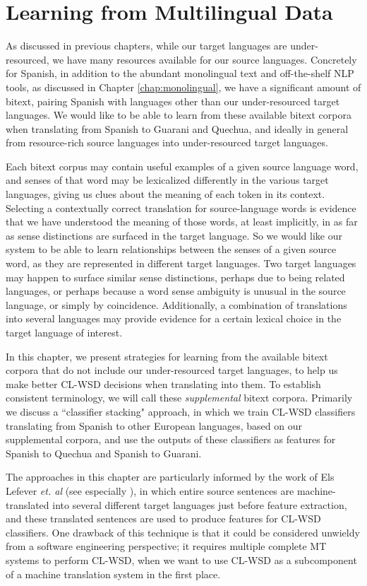 \chapter{Learning from Multilingual Data}
\label{chap:multilingual}
As discussed in previous chapters, while our target languages are
under-resourced, we have many resources available for our source languages.
Concretely for Spanish, in addition to the abundant monolingual text and
off-the-shelf NLP tools, as discussed in Chapter \ref{chap:monolingual}, we
have a significant amount of bitext, pairing Spanish with languages other than
our under-resourced target languages. We would like to be able to learn from
these available bitext corpora when translating from Spanish to Guarani and
Quechua, and ideally in general from resource-rich source languages into
under-resourced target languages.

Each bitext corpus may contain useful examples of a given source language word,
and senses of that word may be lexicalized differently in the various target
languages, giving us clues about the meaning of each token in its context.
Selecting a contextually correct translation for source-language words is
evidence that we have understood the meaning of those words, at least
implicitly, in as far as sense distinctions are surfaced in the target
language. So we would like our system to be able to learn relationships between
the senses of a given source word, as they are represented in different target
languages. Two target languages may happen to surface similar sense
distinctions, perhaps due to being related languages, or perhaps because a word
sense ambiguity is unusual in the source language, or simply by coincidence.
Additionally, a combination of translations into several languages may provide
evidence for a certain lexical choice in the target language of interest.

In this chapter, we present strategies for learning from the available bitext
corpora that do not include our under-resourced target languages, to help us
make better CL-WSD decisions when translating into them. To establish
consistent terminology, we will call these \emph{supplemental} bitext corpora.
Primarily we discuss a ``classifier stacking" approach, in which we train
CL-WSD classifiers translating from Spanish to other European languages, based
on our supplemental corpora, and use the outputs of these classifiers as
features for Spanish to Quechua and Spanish to Guarani.

The approaches in this chapter are particularly informed by the work of Els
Lefever \emph{et. al} (see especially
\cite{lefever-hoste-decock:2011:ACL-HLT2011}), in which entire source sentences
are machine-translated into several different target languages just before
feature extraction, and these translated sentences are used to produce features
for CL-WSD classifiers. One drawback of this technique is that it could be
considered unwieldy from a software engineering perspective; it requires
multiple complete MT systems to perform CL-WSD, when we want to use CL-WSD as a
subcomponent of a machine translation system in the first place.

